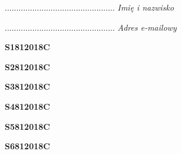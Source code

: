 \begin{turn}{90}\begin{minipage}{\linewidth} \vspace{20mm} ................................................  \textit{Imię i nazwisko}\end{minipage}\end{turn}

\begin{turn}{90}\begin{minipage}{\linewidth} \vspace{20mm} ................................................  \textit{Adres e-mailowy}\end{minipage}\end{turn}

\begin{turn}{90}\huge \begin{minipage}{\linewidth} \vspace{10mm}\textbf{S1812018C}\end{minipage}\end{turn}

\begin{turn}{90}\huge \begin{minipage}{\linewidth} \vspace{10mm}\textbf{S2812018C}\end{minipage}\end{turn}

\begin{turn}{90}\huge \begin{minipage}{\linewidth} \vspace{10mm}\textbf{S3812018C}\end{minipage}\end{turn}

\begin{turn}{90}\huge \begin{minipage}{\linewidth} \vspace{10mm}\textbf{S4812018C}\end{minipage}\end{turn}

\begin{turn}{90}\huge \begin{minipage}{\linewidth} \vspace{10mm}\textbf{S5812018C}\end{minipage}\end{turn}

\begin{turn}{90}\huge \begin{minipage}{\linewidth} \vspace{10mm}\textbf{S6812018C}\end{minipage}\end{turn}

